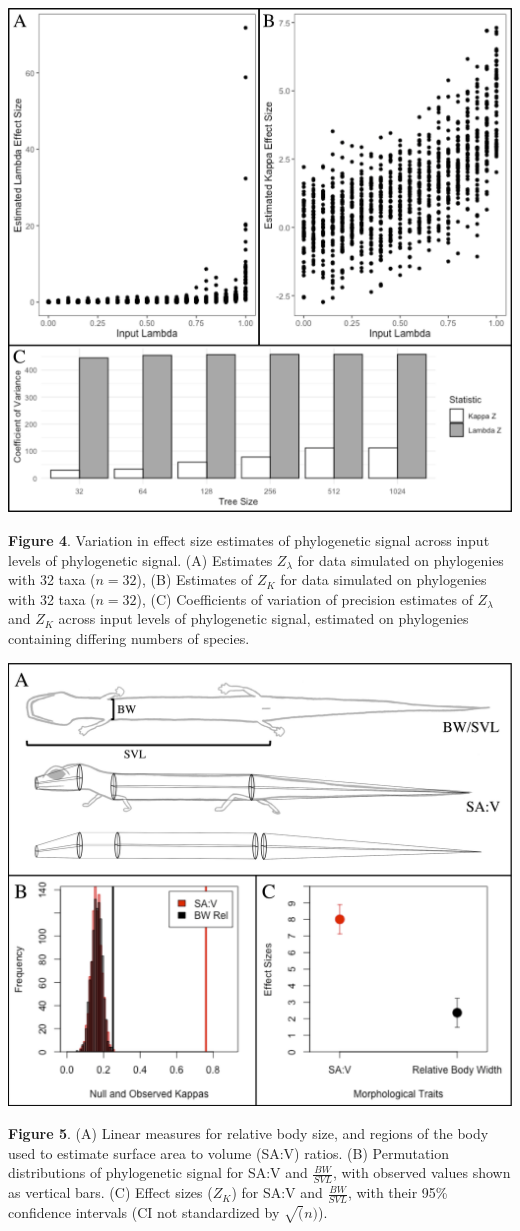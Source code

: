 \documentclass[
]{article}
\begin{document}
\newpage

\includegraphics[width=0.95\linewidth]{Fig4}

\singlespacing \textbf{Figure 4}. Variation in effect size estimates of
phylogenetic signal across input levels of phylogenetic signal. (A)
Estimates \(Z_\lambda\) for data simulated on phylogenies with 32 taxa
(\(n=32\)), (B) Estimates of \(Z_K\) for data simulated on phylogenies
with 32 taxa (\(n=32\)), (C) Coefficients of variation of precision
estimates of \(Z_\lambda\) and \(Z_K\) across input levels of
phylogenetic signal, estimated on phylogenies containing differing
numbers of species.

\includegraphics[width=0.95\linewidth]{Fig5}

\singlespacing \textbf{Figure 5}. (A) Linear measures for relative body
size, and regions of the body used to estimate surface area to volume
(SA:V) ratios. (B) Permutation distributions of phylogenetic signal for
SA:V and \(\frac{BW}{SVL}\), with observed values shown as vertical
bars. (C) Effect sizes (\(Z_K\)) for SA:V and \(\frac{BW}{SVL}\), with
their 95\% confidence intervals (CI not standardized by \(\sqrt(n)\)).
\end{document}
